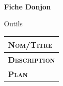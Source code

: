 \documentclass[11pt]{article} %
\begin{document}
\pagestyle{empty}

\begin{center}
    \textbf{Fiche Donjon}

    Outils
\end{center}



\begin{tabularx}{\linewidth}{X}
\hline
    \textsc{\textbf{Nom/Titre}} \\\hline
    \textsc{\textbf{Description}} \vspace{5cm} \\\hline

    \textsc{\textbf{Plan}} \vspace{20cm} \\

\hline
\end{tabularx}
\end{document}
